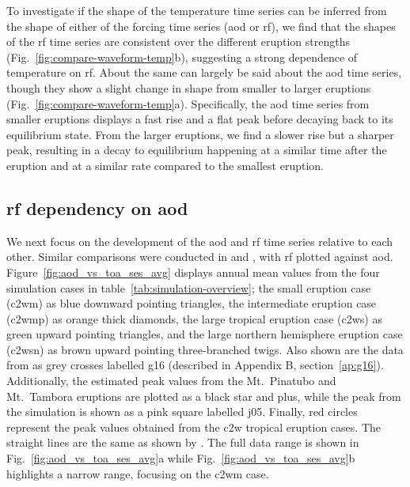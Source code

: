 \documentclass{ametsocV6.1}
\begin{document}
To investigate if the shape of the temperature time series can be inferred from the
shape of either of the forcing time series (\gls{aod} or \gls{rf}), we find that the
shapes of the \gls{rf} time series are consistent over the different eruption strengths
(Fig.~\ref{fig:compare-waveform-temp}b), suggesting a strong dependence of temperature
on \gls{rf}. About the same can largely be said about the \gls{aod} time series, though
they show a slight change in shape from smaller to larger eruptions
(Fig.~\ref{fig:compare-waveform-temp}a). Specifically, the \gls{aod} time series from
smaller eruptions displays a fast rise and a flat peak before decaying back to its
equilibrium state. From the larger eruptions, we find a slower rise but a sharper peak,
resulting in a decay to equilibrium happening at a similar time after the eruption and
at a similar rate compared to the smallest eruption.

\subsection{\gls{rf} dependency on \gls{aod}}

We next focus on the development of the \gls{aod} and \gls{rf} time series relative to
each other. Similar comparisons were conducted in \citet[][their Fig.\ 4]{gregory2016}
and \citet[][their Fig.\ 1]{marshall2020}, with \gls{rf} plotted against \gls{aod}.
Figure~\ref{fig:aod_vs_toa_ses_avg} displays annual mean values from the four simulation
cases in table~\ref{tab:simulation-overview}; the small eruption case (\gls{c2wm}) as
blue downward pointing triangles, the intermediate eruption case (\gls{c2wmp}) as orange
thick diamonds, the large tropical eruption case (\gls{c2ws}) as green upward pointing
triangles, and the large northern hemisphere eruption case (\gls{c2wsn}) as brown upward
pointing three-branched twigs. Also shown are the data from \citet[][Fig.\ 4, black
  crosses from HadCM3 sstPiHistVol]{gregory2016} as grey crosses labelled \gls{g16}
(described in Appendix B, section~\ref{ap:g16}). Additionally, the estimated peak values
from the Mt.\ Pinatubo and Mt.\ Tambora eruptions are plotted as a black star and plus,
while the peak from the \citet{jones2005} simulation is shown as a pink square labelled
\gls{j05}. Finally, red circles represent the peak values obtained from the \gls{c2w}
tropical eruption cases. The straight lines are the same as shown by
\citet{gregory2016}. The full data range is shown in Fig.~\ref{fig:aod_vs_toa_ses_avg}a
while Fig.~\ref{fig:aod_vs_toa_ses_avg}b highlights a narrow range, focusing on the
\gls{c2wm} case.
\end{document}
